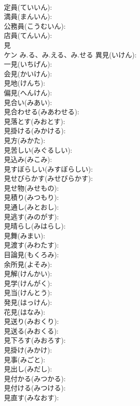 \documentclass[8pt]{extreport}
\begin{document}
\begin{CJK}{UTF8}{min}
\\	定員(ていいん): 
\\	満員(まんいん): 
\\	公務員(こうむいん): 
\\	店員(てんいん): 
\\	見			
\\	ケン	み.る、み.える、み.せる	異見(いけん): 
\\	一見(いちげん): 
\\	会見(かいけん): 
\\	見地(けんち): 
\\	偏見(へんけん): 
\\	見合い(みあい): 
\\	見合わせる(みあわせる): 
\\	見落とす(みおとす): 
\\	見掛ける(みかける): 
\\	見方(みかた): 
\\	見苦しい(みぐるしい): 
\\	見込み(みこみ): 
\\	見すぼらしい(みすぼらしい): 
\\	見せびらかす(みせびらかす): 
\\	見せ物(みせもの): 
\\	見積り(みつもり): 
\\	見通し(みとおし): 
\\	見逃す(みのがす): 
\\	見晴らし(みはらし): 
\\	見舞(みまい): 
\\	見渡す(みわたす): 
\\	目論見(もくろみ): 
\\	余所見(よそみ): 
\\	見解(けんかい): 
\\	見学(けんがく): 
\\	見当(けんとう): 
\\	発見(はっけん): 
\\	花見(はなみ): 
\\	見送り(みおくり): 
\\	見送る(みおくる): 
\\	見下ろす(みおろす): 
\\	見掛け(みかけ): 
\\	見事(みごと): 
\\	見出し(みだし): 
\\	見付かる(みつかる): 
\\	見付ける(みつける): 
\\	見直す(みなおす): 

\end{CJK}
\end{document}
